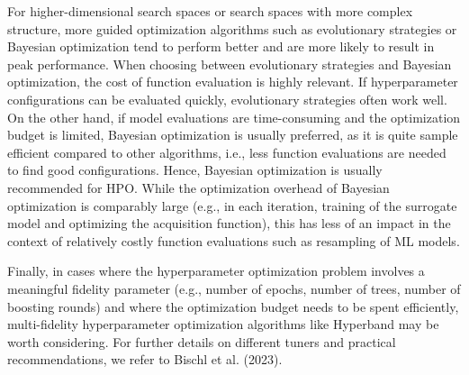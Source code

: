 For higher-dimensional search spaces or search spaces with more complex
structure, more guided optimization algorithms such as evolutionary
strategies or Bayesian optimization tend to perform better and are more
likely to result in peak performance. When choosing between evolutionary
strategies and Bayesian
optimization, the cost of function
evaluation is highly relevant. If hyperparameter configurations can be
evaluated quickly, evolutionary strategies often work well. On the other
hand, if model evaluations are time-consuming and the optimization
budget is limited, Bayesian optimization is usually preferred, as it is
quite sample efficient compared to other algorithms, i.e., less function
evaluations are needed to find good configurations. Hence, Bayesian
optimization is usually recommended for HPO. While the optimization
overhead of Bayesian optimization is comparably large (e.g., in each
iteration, training of the surrogate model and optimizing the
acquisition function), this has less of an impact in the context of
relatively costly function evaluations such as resampling of ML models.

Finally, in cases where the hyperparameter optimization problem involves
a meaningful fidelity parameter (e.g., number of epochs, number of
trees, number of boosting rounds) and where the optimization budget
needs to be spent efficiently, multi-fidelity hyperparameter
optimization algorithms like Hyperband may be worth considering. For
further details on different tuners and practical recommendations, we
refer to Bischl et al. (2023).

